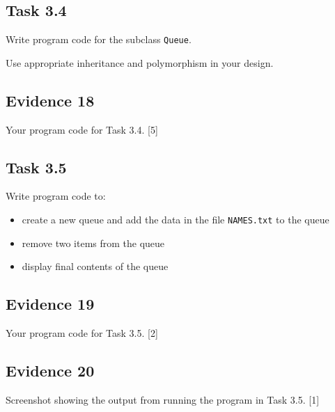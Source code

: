 \subsection*{Task 3.4 }

Write program code for the subclass \texttt{Queue}.

Use appropriate inheritance and polymorphism in your design. 

\subsection*{Evidence 18}

Your program code for Task 3.4. \hfill{} {[}5{]}

\subsection*{Task 3.5 }

Write program code to: 
\begin{itemize}
\item create a new queue and add the data in the file \texttt{NAMES.txt}
to the queue 
\item remove two items from the queue 
\item display final contents of the queue 
\end{itemize}

\subsection*{Evidence 19 }

Your program code for Task 3.5. \hfill{} {[}2{]}

\subsection*{Evidence 20}

Screenshot showing the output from running the program in Task 3.5.
\hfill{} {[}1{]}